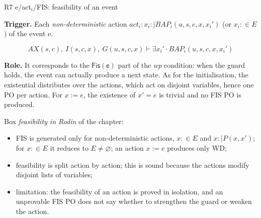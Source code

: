 \documentclass[11pt,a4paper]{article}
\newcommand{\AX}{\mathit{AX}(s,c)}
\newcommand{\sff}[1]{\textsf{#1}}
\newcommand{\po}[1]{\textsf{\small #1}}
\newcommand{\Fis}{\mathsf{Fis}}
\newcommand{\champ}[1]{\par\smallskip\noindent\textbf{#1}\enspace}
\begin{document}
\begin{regle}{R7 \quad \po{e/act$_i$/FIS}: feasibility of an event}
  \champ{Trigger.} Each \emph{non-deterministic} action
  $act_i : x_i :\mid \mathit{BAP}_i(u,s,c,x,x_i')$ (or $x_i :\in E$) of the event \sff{e}.
  
  \[ \AX,\ I(s,c,x),\ G(u,s,c,x) \vdash \exists x_i'\cdot \mathit{BAP}_i(u,s,c,x,x_i') \]
  \champ{Role.} It corresponds to the $\Fis(\sff{e})$ part of the \emph{wp}
  condition: when the guard holds, the event can actually produce a next state. As
  for the initialisation, the existential distributes over the actions, which act
  on disjoint variables, hence one PO per action. For $x:=e$, the existence of
  $x'=e$ is trivial and no \po{FIS} PO is produced.
\end{regle}
\begin{rodin}
  Box \emph{feasibility in Rodin} of the chapter:
  \begin{itemize}
    \item \po{FIS} is generated only for non-deterministic actions, $x:\in E$ and
      $x:\mid P(x,x')$; for $x:\in E$ it reduces to $E\neq\varnothing$; an action
      $x:=e$ produces only \po{WD};
    \item feasibility is split action by action; this is sound because the actions
      modify disjoint lists of variables;
    \item limitation: the feasibility of an action is proved in isolation, and an
      unprovable \po{FIS} PO does not say whether to strengthen the guard or weaken
      the action.
  \end{itemize}
\end{rodin}
\end{document}
